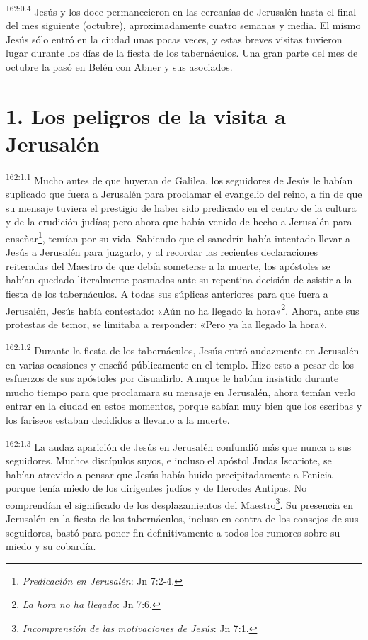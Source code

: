 \par 
\textsuperscript{162:0.4} Jesús y los doce permanecieron en las cercanías de Jerusalén hasta el final del mes siguiente (octubre), aproximadamente cuatro semanas y media. El mismo Jesús sólo entró en la ciudad unas pocas veces, y estas breves visitas tuvieron lugar durante los días de la fiesta de los tabernáculos. Una gran parte del mes de octubre la pasó en Belén con Abner y sus asociados.

\section*{1. Los peligros de la visita a Jerusalén}
\par 
\textsuperscript{162:1.1} Mucho antes de que huyeran de Galilea, los seguidores de Jesús le habían suplicado que fuera a Jerusalén para proclamar el evangelio del reino, a fin de que su mensaje tuviera el prestigio de haber sido predicado en el centro de la cultura y de la erudición judías; pero ahora que había venido de hecho a Jerusalén para enseñar\footnote{\textit{Predicación en Jerusalén}: Jn 7:2-4.}, temían por su vida. Sabiendo que el sanedrín había intentado llevar a Jesús a Jerusalén para juzgarlo, y al recordar las recientes declaraciones reiteradas del Maestro de que debía someterse a la muerte, los apóstoles se habían quedado literalmente pasmados ante su repentina decisión de asistir a la fiesta de los tabernáculos. A todas sus súplicas anteriores para que fuera a Jerusalén, Jesús había contestado: «Aún no ha llegado la hora»\footnote{\textit{La hora no ha llegado}: Jn 7:6.}. Ahora, ante sus protestas de temor, se limitaba a responder: «Pero ya ha llegado la hora».

\par 
\textsuperscript{162:1.2} Durante la fiesta de los tabernáculos, Jesús entró audazmente en Jerusalén en varias ocasiones y enseñó públicamente en el templo. Hizo esto a pesar de los esfuerzos de sus apóstoles por disuadirlo. Aunque le habían insistido durante mucho tiempo para que proclamara su mensaje en Jerusalén, ahora temían verlo entrar en la ciudad en estos momentos, porque sabían muy bien que los escribas y los fariseos estaban decididos a llevarlo a la muerte.

\par 
\textsuperscript{162:1.3} La audaz aparición de Jesús en Jerusalén confundió más que nunca a sus seguidores. Muchos discípulos suyos, e incluso el apóstol Judas Iscariote, se habían atrevido a pensar que Jesús había huido precipitadamente a Fenicia porque tenía miedo de los dirigentes judíos y de Herodes Antipas. No comprendían el significado de los desplazamientos del Maestro\footnote{\textit{Incomprensión de las motivaciones de Jesús}: Jn 7:1.}. Su presencia en Jerusalén en la fiesta de los tabernáculos, incluso en contra de los consejos de sus seguidores, bastó para poner fin definitivamente a todos los rumores sobre su miedo y su cobardía.

